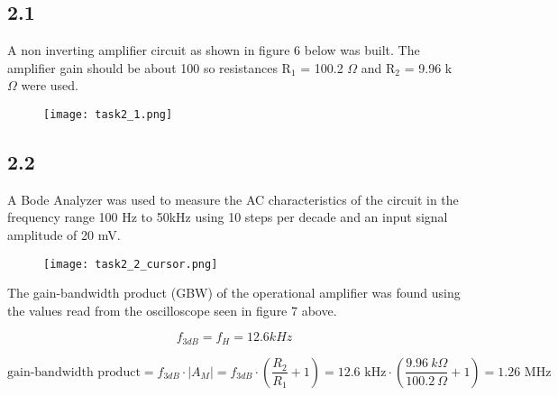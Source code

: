 \subsection*{2.1}

    A non inverting amplifier circuit as shown in figure 6 below was built. The amplifier gain should be about 100 so resistances R$_1$ = 100.2 $\Omega$ and R$_2$ = 9.96 k$\Omega$ were used.

    \begin{figure}[h!]
        \centering
        \texttt{[image: task2\_1.png]}
    \end{figure}

\subsection*{2.2}

    A Bode Analyzer was used to measure the AC characteristics of the circuit in the frequency range 100 Hz to 50kHz using 10 steps per decade and an input signal amplitude of 20 mV.\\

    \begin{figure}[h!]
        \centering
        \texttt{[image: task2\_2\_cursor.png]}
    \end{figure}

    The gain-bandwidth product (GBW) of the operational amplifier was found using the values read from the oscilloscope seen in figure 7 above. 

    $$f_{3dB} = f_{H} = 12.6 kHz$$

    $$\text{gain-bandwidth product} = f_{3dB} \cdot |A_M| = f_{3dB} \cdot (\frac{R_2}{R_1} + 1) = 12.6\text{ kHz} \cdot (\frac{9.96\ k \Omega}{100.2\ \Omega} + 1) = 1.26 \text{ MHz}$$

